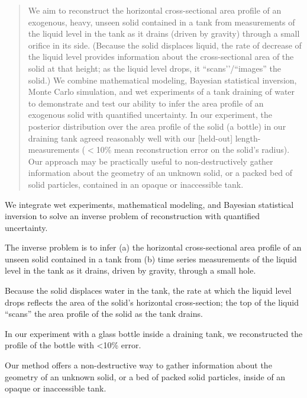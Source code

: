 \documentclass[a4paper,fleqn]{cas-dc}
\begin{document}
\begin{abstract}
We aim to reconstruct the horizontal cross-sectional area profile of an exogenous, heavy, unseen solid contained in a tank from measurements of the liquid level in the tank as it drains (driven by gravity) through a small orifice in its side. (Because the solid displaces liquid, the rate of decrease of the liquid level provides information about the cross-sectional area of the solid at that height; as the liquid level drops, it ``scans’'/``images'' the solid.) We combine mathematical modeling, Bayesian statistical inversion, Monte Carlo simulation, and wet experiments of a tank draining of water to demonstrate and test our ability to infer the area profile of an exogenous solid with quantified uncertainty. In our experiment, the posterior distribution over the area profile of the solid (a bottle) in our draining tank agreed reasonably well with our [held-out] length-measurements ($<$10\% mean reconstruction error on the solid's radius). Our approach may be practically useful to non-destructively gather information about the geometry of an unknown solid, or a packed bed of solid particles, contained in an opaque or inaccessible tank.
\end{abstract}


\begin{highlights}
\item We integrate wet experiments, mathematical modeling, and Bayesian statistical inversion to solve an inverse problem of reconstruction with quantified uncertainty.
\item The inverse problem is to infer (a) the horizontal cross-sectional area profile of an unseen solid contained in a tank from (b) time series measurements of the liquid level in the tank as it drains, driven by gravity, through a small hole.
\item Because the solid displaces water in the tank, the rate at which the liquid level drops reflects the area of the solid's horizontal cross-section; the top of the liquid ``scans'' the area profile of the solid as the tank drains.
\item In our experiment with a glass bottle inside a draining tank, we reconstructed the profile of the bottle with <10\% error.
\item Our method offers a non-destructive way to gather information about the geometry of an unknown solid, or a bed of packed solid particles, inside of an opaque or inaccessible tank.
\end{highlights}
\end{document}
